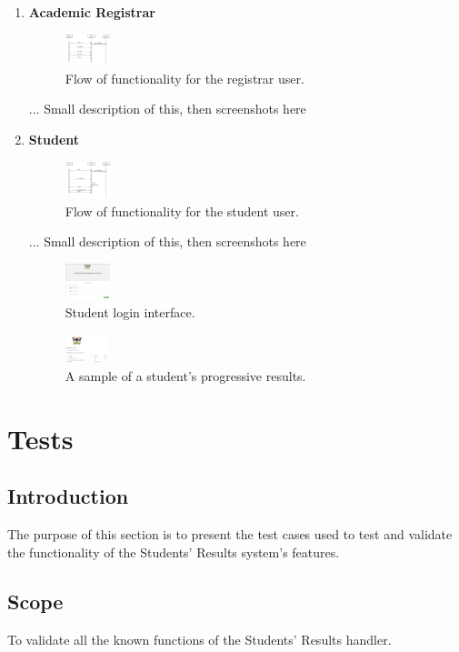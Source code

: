 \begin{enumerate}
\item \textbf{Academic Registrar}
\begin{figure}[H]
\caption{Flow of functionality for the registrar user.}
\includegraphics[width=1.3cm]{images/SequenceRegistrar.png}
\end{figure}
... Small description of this, then screenshots here
\item \textbf{Student}
\begin{figure}[H]
\caption{Flow of functionality for the student user.}
\includegraphics[width=1.3cm]{images/SequenceStudent.png}
\end{figure}
... Small description of this, then screenshots here

\begin{figure}[H]
\caption{Student login interface.}
\includegraphics[width=1.3cm]{images/student_login.png}
\end{figure}

\begin{figure}[H]
\caption{A sample of a student's progressive results.}
\includegraphics[width=1.3cm]{images/results.png}
\end{figure}
\end{enumerate}
\section{Tests}
\subsection{Introduction}
The purpose of this section is to present the test cases used to test and validate the functionality of the Students' Results system's features.
\subsection{Scope}
To validate all the known functions of the Students' Results handler.
